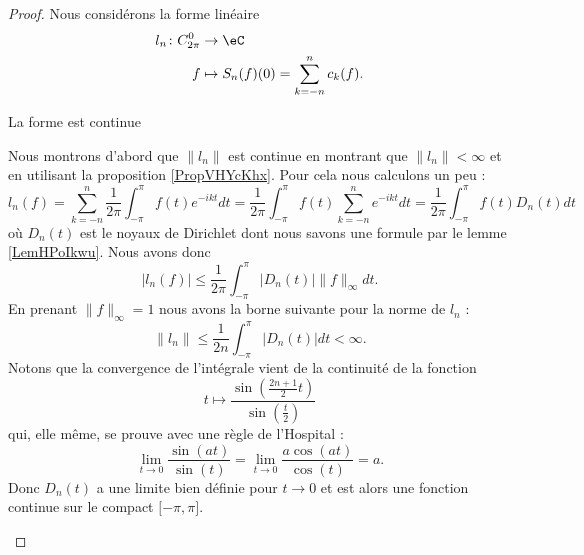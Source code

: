 \begin{proof}
    Nous considérons la forme linéaire
    \begin{equation}
        \begin{aligned}
            l_n\colon C^0_{2\pi}&\to \eC \\
            f&\mapsto S_n(f)(0)=\sum_{k=-n}^nc_k(f). 
        \end{aligned}
    \end{equation}
    \begin{subproof}
        \item[La forme est continue]
            
            Nous montrons d'abord que \( \| l_n \|\) est continue en montrant que \( \| l_n \|<\infty\) et en utilisant la proposition \ref{PropVHYcKhx}. Pour cela nous calculons un peu :
            \begin{equation}    \label{EqBELHGya}
                l_n(f)=\sum_{k=-n}^n\frac{1}{ 2\pi }\int_{-\pi}^{\pi}f(t) e^{-ikt}dt=\frac{1}{ 2\pi }\int_{-\pi}^{\pi}f(t)\sum_{k=-n}^n e^{-ikt}dt=\frac{1}{ 2\pi }\int_{-\pi}^{\pi}f(t)D_n(t)dt
            \end{equation}
            où \( D_n(t)\) est le noyaux de Dirichlet dont nous savons une formule par le lemme \ref{LemHPoIkwu}. Nous avons donc
            \begin{equation}
                | l_n(f) |\leq \frac{1}{ 2\pi }\int_{-\pi}^{\pi}| D_n(t) |\| f \|_{\infty}dt.
            \end{equation}
            En prenant \( \| f \|_{\infty}=1\) nous avons la borne suivante pour la norme de \( l_n\) :
            \begin{equation}        \label{EqBXoIUiD}
                \| l_n \|\leq \frac{1}{ 2n }\int_{-\pi}^{\pi}| D_n(t) |dt<\infty.
            \end{equation}
            Notons que la convergence de l'intégrale vient de la continuité de la fonction
            \begin{equation}
                t\mapsto \frac{ \sin\left( \frac{ 2n+1 }{2}t \right) }{ \sin\left( \frac{ t }{ 2 } \right) }
            \end{equation}
            qui, elle même, se prouve avec une règle de l'Hospital :
            \begin{equation}
                \lim_{t\to 0} \frac{ \sin(at) }{ \sin(t) }=\lim_{t\to 0} \frac{ a\cos(at) }{ \cos(t) }=a.
            \end{equation}
            Donc \( D_n(t)\) a une limite bien définie pour \( t\to 0\) et est alors une fonction continue sur le compact \( \mathopen[ -\pi , \pi \mathclose]\).


\end{subproof}
\end{proof}
